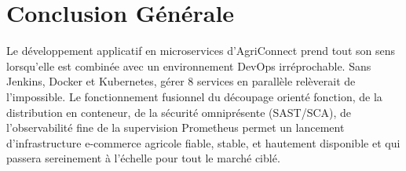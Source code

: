 \documentclass[12pt,a4paper]{article}
\begin{document}
\section{Conclusion Générale}
Le développement applicatif en microservices d'AgriConnect prend tout son sens lorsqu'elle est combinée avec un environnement DevOps irréprochable. Sans Jenkins, Docker et Kubernetes, gérer 8 services en parallèle relèverait de l'impossible. Le fonctionnement fusionnel du découpage orienté fonction, de la distribution en conteneur, de la sécurité omniprésente (SAST/SCA), de l'observabilité fine de la supervision Prometheus permet un lancement d'infrastructure e-commerce agricole fiable, stable, et hautement disponible et qui passera sereinement à l'échelle pour tout le marché ciblé.
\end{document}
